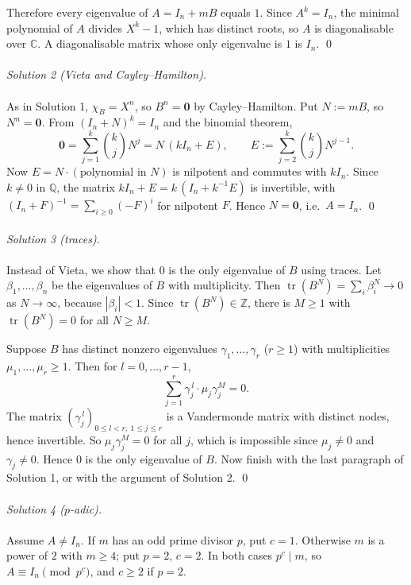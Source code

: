 \begin{solution}
    Therefore every eigenvalue of \( A = I_n + mB \) equals \( 1 \). Since \( A^k = I_n \), the minimal polynomial of \( A \) divides \( X^k - 1 \), which has distinct roots, so \( A \) is diagonalisable over \( \mathbb{C} \). A diagonalisable matrix whose only eigenvalue is \( 1 \) is \( I_n \). \qed
    \\\\
    \textit{Solution 2 (Vieta and Cayley--Hamilton).}
    \\\\
    As in Solution 1, \( \chi_B = X^n \), so \( B^n = \mathbf{0} \) by Cayley--Hamilton. Put \( N := mB \), so \( N^n = \mathbf{0} \). From \( \left(I_n + N\right)^k = I_n \) and the binomial theorem,
    \[
        \mathbf{0} = \sum_{j=1}^{k} \binom{k}{j} N^j = N\,\left(kI_n + E\right), \qquad E := \sum_{j=2}^{k} \binom{k}{j} N^{j-1}.
    \]
    Now \( E = N \cdot \left(\text{polynomial in } N\right) \) is nilpotent and commutes with \( kI_n \). Since \( k \neq 0 \) in \( \mathbb{Q} \), the matrix \( kI_n + E = k\,\left(I_n + k^{-1}E\right) \) is invertible, with \( \left(I_n + F\right)^{-1} = \sum_{i \geq 0} \left(-F\right)^i \) for nilpotent \( F \). Hence \( N = \mathbf{0} \), i.e.\ \( A = I_n \). \qed
    \\\\
    \textit{Solution 3 (traces).}
    \\\\
    Instead of Vieta, we show that \( 0 \) is the only eigenvalue of \( B \) using traces. Let \( \beta_1, \dots, \beta_n \) be the eigenvalues of \( B \) with multiplicity. Then \( \operatorname{tr}\left(B^N\right) = \sum_i \beta_i^N \to 0 \) as \( N \to \infty \), because \( |\beta_i| < 1 \). Since \( \operatorname{tr}\left(B^N\right) \in \mathbb{Z} \), there is \( M \geq 1 \) with \( \operatorname{tr}\left(B^N\right) = 0 \) for all \( N \geq M \).

    Suppose \( B \) has distinct nonzero eigenvalues \( \gamma_1, \dots, \gamma_r \) (\( r \geq 1 \)) with multiplicities \( \mu_1, \dots, \mu_r \geq 1 \). Then for \( l = 0, \dots, r-1 \),
    \[
        \sum_{j=1}^{r} \gamma_j^{\,l} \cdot \mu_j \gamma_j^{M} = 0.
    \]
    The matrix \( \left(\gamma_j^{\,l}\right)_{0 \leq l < r,\ 1 \leq j \leq r} \) is a Vandermonde matrix with distinct nodes, hence invertible. So \( \mu_j \gamma_j^M = 0 \) for all \( j \), which is impossible since \( \mu_j \neq 0 \) and \( \gamma_j \neq 0 \). Hence \( 0 \) is the only eigenvalue of \( B \). Now finish with the last paragraph of Solution 1, or with the argument of Solution 2. \qed
    \\\\
    \textit{Solution 4 (\( p \)-adic).}
    \\\\
    Assume \( A \neq I_n \). If \( m \) has an odd prime divisor \( p \), put \( c = 1 \). Otherwise \( m \) is a power of \( 2 \) with \( m \geq 4 \); put \( p = 2 \), \( c = 2 \). In both cases \( p^c \mid m \), so \( A \equiv I_n \pmod{p^c} \), and \( c \geq 2 \) if \( p = 2 \).


\end{solution}
